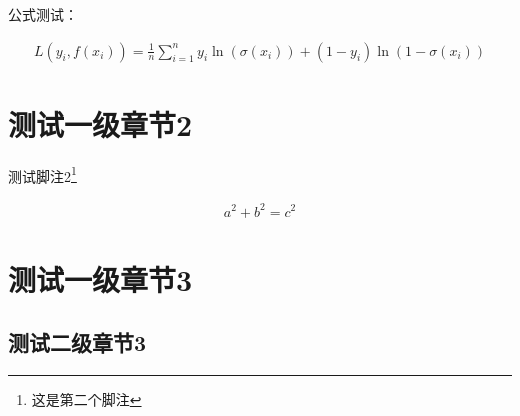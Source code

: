 \documentclass{SUIBEthesis}
\begin{document}
公式测试：

\begin{eqnarray}
L(y_i, f(x_i)) = \frac{1}{n}\sum_{i=1}^n y_i \ln (\sigma(x_i)) + (1-y_i)\ln (1-\sigma(x_i))
\end{eqnarray}



\section{测试一级章节2}
测试脚注2\footnote{这是第二个脚注}

\begin{eqnarray}
a^2 + b^2 = c^2
\end{eqnarray}

\section{测试一级章节3}

\subsection{测试二级章节3}
\end{document}
